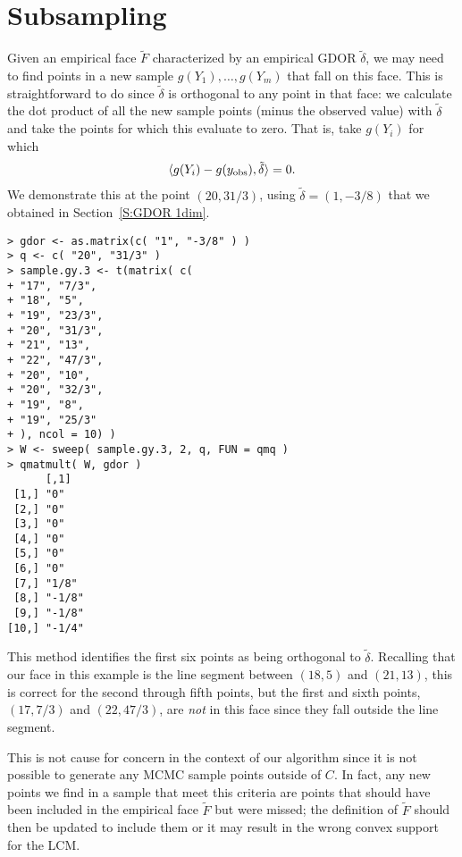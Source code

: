 \section{Subsampling} \label{S:Subsampling}
Given an empirical face $\tilde{F}$ characterized by an empirical GDOR $\tilde{\delta}$, 
we may need to find points in a new sample $g(Y_1), \ldots, g(Y_m)$ that fall on this face.  This is straightforward to
do since $\tilde{\delta}$ is orthogonal to any point in that face:
we calculate the dot product of all the new sample points (minus the
observed value) with $\tilde{\delta}$
and take the points for which this evaluate to zero.  That is, take $g(Y_i)$ for which
\begin{align*}
 \langle  g(Y_i) - g(y_{\text{obs}}), \tilde{\delta}  \rangle = 0.
\end{align*}
We demonstrate this at the point $(20, 31/3)$, using $\tilde{\delta} = (1, -3/8)$
that we obtained in Section~\ref{S:GDOR 1dim}.
{\singlespace
\begin{verbatim}
> gdor <- as.matrix(c( "1", "-3/8" ) )
> q <- c( "20", "31/3" )
> sample.gy.3 <- t(matrix( c(
+ "17", "7/3",
+ "18", "5",
+ "19", "23/3",
+ "20", "31/3",
+ "21", "13",
+ "22", "47/3",
+ "20", "10",
+ "20", "32/3",
+ "19", "8",
+ "19", "25/3"
+ ), ncol = 10) )
> W <- sweep( sample.gy.3, 2, q, FUN = qmq )
> qmatmult( W, gdor )
      [,1]  
 [1,] "0"   
 [2,] "0"   
 [3,] "0"   
 [4,] "0"   
 [5,] "0"   
 [6,] "0"   
 [7,] "1/8" 
 [8,] "-1/8"
 [9,] "-1/8"
[10,] "-1/4"
\end{verbatim}
}
This method identifies the first six points as being orthogonal to $\tilde{\delta}$.
Recalling that our face in this example is the line segment between $(18,5)$ and $(21,13)$,
this is correct for the second through fifth points, but
the first and sixth points, $(17, 7/3)$ and $(22,47/3)$, 
are \emph{not} in this face since they fall outside the line segment.  

This is not cause for concern in the context of our algorithm
since it is not possible to generate any MCMC sample points outside of $C$.
In fact, any new points we find in a sample that meet this criteria
are points that should have been included in the empirical face $\tilde{F}$ but were missed;
the definition of $\tilde{F}$ should then be updated to include them
or it may result in the wrong convex support for the LCM.

